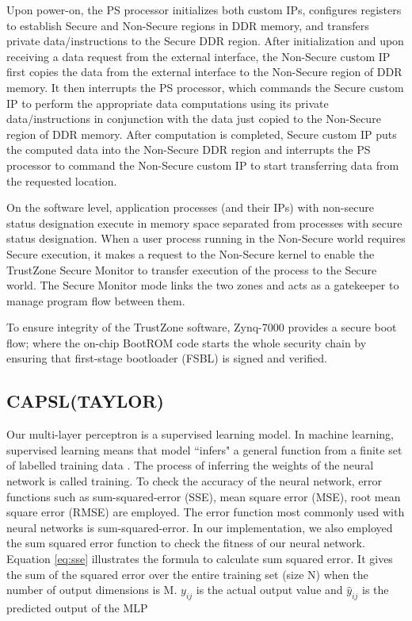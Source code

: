 \documentclass[sigconf]{acmart}
\theoremstyle{plain}
\theoremstyle{remark}
\begin{document}
Upon power-on, the PS processor initializes both custom IPs, configures registers to establish Secure and Non-Secure regions in DDR memory, and transfers private
data/instructions to the Secure DDR region. After initialization and upon receiving a data request from the external interface, the
Non-Secure custom IP first copies the data from the external interface to the Non-Secure region of DDR memory. It then interrupts the PS processor, which
commands the Secure custom IP to perform the appropriate data computations using its private data/instructions in conjunction with the data just copied to the
Non-Secure region of DDR memory. After computation is completed, Secure custom IP puts the computed data into the Non-Secure DDR region and interrupts the PS processor to command the Non-Secure custom IP to start transferring data from the requested location.


On the software level, application processes (and their IPs) with non-secure status designation execute in memory space separated from processes with secure status designation. When a user process running in the Non-Secure world requires Secure execution, it makes a request to the Non-Secure kernel to enable the TrustZone Secure Monitor to transfer execution of the process to the Secure world. The Secure Monitor mode links the two zones and acts as a gatekeeper to manage program flow between them. 

To ensure integrity of the TrustZone software, Zynq-7000 provides a secure boot flow; where the on-chip BootROM code starts the whole security chain by ensuring that first-stage bootloader (FSBL) is signed and verified.

\subsection{CAPSL(TAYLOR)}
Our multi-layer perceptron is a supervised learning model. In machine learning, supervised learning means that model ``infers" a general function from a finite set of labelled training data \cite{regularization}. The process of inferring the weights of the neural network is called training. To check the accuracy of the neural network, error functions such as sum-squared-error (SSE), mean square error (MSE), root mean square error (RMSE) are employed. The error function most commonly used with neural networks is sum-squared-error. In our implementation, we also employed the sum squared error function to check the fitness of our neural network. Equation \ref{eq:sse} illustrates the formula to calculate sum squared error. It gives the sum of the squared error over the entire training set (size N) when the number of output dimensions is M. \begin{math}y_{ij}\end{math} is the actual output value and \begin{math}\hat{y}_{ij}\end{math} is the predicted output of the MLP
\end{document}
